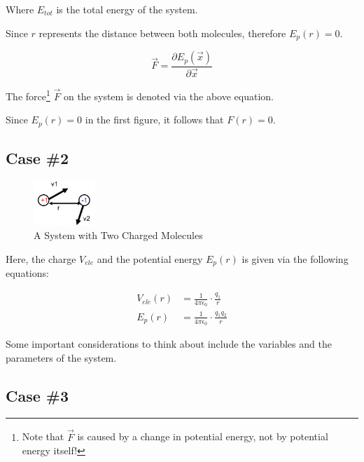 \documentclass[
  letterpaper,
  DIV=11,
  numbers=noendperiod]{scrreprt}
\begin{document}
Where \(E_{tot}\) is the total energy of the system.

Since \(r\) represents the distance between both molecules, therefore
\(E_p(r) = 0\).

\begin{equation}
  \vec{F} = \frac{\partial E_p(\vec{x})}{\partial \vec{x}}
\end{equation}

The force\footnote{Note that \(\vec{F}\) is caused by a change in
  potential energy, not by potential energy itself!} \(\vec{F}\) on the
system is denoted via the above equation.

Since \(E_p(r) = 0\) in the first figure, it follows that \(F(r) = 0\).

\hypertarget{case-2-1}{%
\subsection{Case \#2}\label{case-2-1}}

\begin{figure}

{\centering \includegraphics[width=0.92in,height=\textheight]{./images/wk1/sys2.jpg}

}

\caption{A System with Two Charged Molecules}

\end{figure}

Here, the charge \(V_{ele}\) and the potential energy \(E_p(r)\) is
given via the following equations:

\begin{align}
  V_{ele}(r) &= \frac{1}{4\pi \epsilon_0} \cdot \frac{q_1}{r} \\ 
  E_p(r) &= \frac{1}{4\pi \epsilon_0} \cdot \frac{q_1q_2}{r}
\end{align}

Some important considerations to think about include the variables and
the parameters of the system.

\hypertarget{case-3-1}{%
\subsection{Case \#3}\label{case-3-1}}
\end{document}
